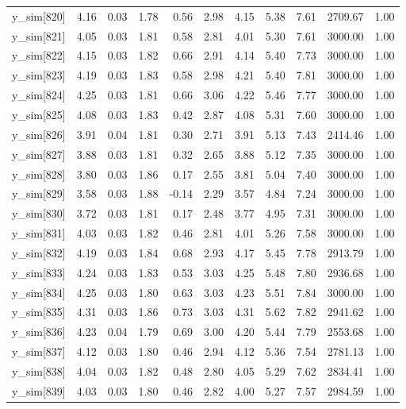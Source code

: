 \begin{table}[ht]
\begin{tabular}{rrrrrrrrrrr}
  y\_sim[820] & 4.16 & 0.03 & 1.78 & 0.56 & 2.98 & 4.15 & 5.38 & 7.61 & 2709.67 & 1.00 \\ 
  y\_sim[821] & 4.05 & 0.03 & 1.81 & 0.58 & 2.81 & 4.01 & 5.30 & 7.61 & 3000.00 & 1.00 \\ 
  y\_sim[822] & 4.15 & 0.03 & 1.82 & 0.66 & 2.91 & 4.14 & 5.40 & 7.73 & 3000.00 & 1.00 \\ 
  y\_sim[823] & 4.19 & 0.03 & 1.83 & 0.58 & 2.98 & 4.21 & 5.40 & 7.81 & 3000.00 & 1.00 \\ 
  y\_sim[824] & 4.25 & 0.03 & 1.81 & 0.66 & 3.06 & 4.22 & 5.46 & 7.77 & 3000.00 & 1.00 \\ 
  y\_sim[825] & 4.08 & 0.03 & 1.83 & 0.42 & 2.87 & 4.08 & 5.31 & 7.60 & 3000.00 & 1.00 \\ 
  y\_sim[826] & 3.91 & 0.04 & 1.81 & 0.30 & 2.71 & 3.91 & 5.13 & 7.43 & 2414.46 & 1.00 \\ 
  y\_sim[827] & 3.88 & 0.03 & 1.81 & 0.32 & 2.65 & 3.88 & 5.12 & 7.35 & 3000.00 & 1.00 \\ 
  y\_sim[828] & 3.80 & 0.03 & 1.86 & 0.17 & 2.55 & 3.81 & 5.04 & 7.40 & 3000.00 & 1.00 \\ 
  y\_sim[829] & 3.58 & 0.03 & 1.88 & -0.14 & 2.29 & 3.57 & 4.84 & 7.24 & 3000.00 & 1.00 \\ 
  y\_sim[830] & 3.72 & 0.03 & 1.81 & 0.17 & 2.48 & 3.77 & 4.95 & 7.31 & 3000.00 & 1.00 \\ 
  y\_sim[831] & 4.03 & 0.03 & 1.82 & 0.46 & 2.81 & 4.01 & 5.26 & 7.58 & 3000.00 & 1.00 \\ 
  y\_sim[832] & 4.19 & 0.03 & 1.84 & 0.68 & 2.93 & 4.17 & 5.45 & 7.78 & 2913.79 & 1.00 \\ 
  y\_sim[833] & 4.24 & 0.03 & 1.83 & 0.53 & 3.03 & 4.25 & 5.48 & 7.80 & 2936.68 & 1.00 \\ 
  y\_sim[834] & 4.25 & 0.03 & 1.80 & 0.63 & 3.03 & 4.23 & 5.51 & 7.84 & 3000.00 & 1.00 \\ 
  y\_sim[835] & 4.31 & 0.03 & 1.86 & 0.73 & 3.03 & 4.31 & 5.62 & 7.82 & 2941.62 & 1.00 \\ 
  y\_sim[836] & 4.23 & 0.04 & 1.79 & 0.69 & 3.00 & 4.20 & 5.44 & 7.79 & 2553.68 & 1.00 \\ 
  y\_sim[837] & 4.12 & 0.03 & 1.80 & 0.46 & 2.94 & 4.12 & 5.36 & 7.54 & 2781.13 & 1.00 \\ 
  y\_sim[838] & 4.04 & 0.03 & 1.82 & 0.48 & 2.80 & 4.05 & 5.29 & 7.62 & 2834.41 & 1.00 \\ 
  y\_sim[839] & 4.03 & 0.03 & 1.80 & 0.46 & 2.82 & 4.00 & 5.27 & 7.57 & 2984.59 & 1.00 \\ 

\end{tabular}
\end{table}
